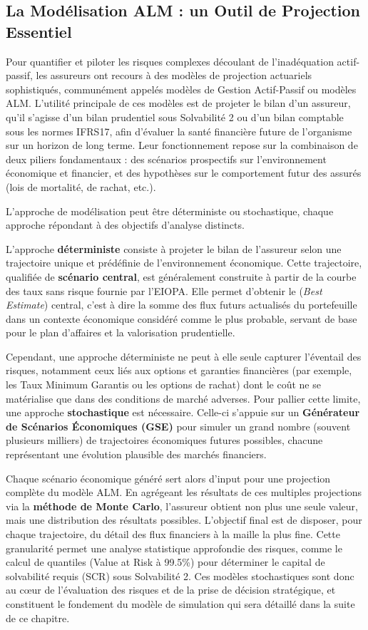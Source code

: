 \subsection{La Modélisation ALM : un Outil de Projection Essentiel}

Pour quantifier et piloter les risques complexes découlant de l'inadéquation actif-passif, les assureurs ont recours à des modèles de projection actuariels sophistiqués, communément appelés modèles de Gestion Actif-Passif ou modèles ALM. L'utilité principale de ces modèles est de projeter le bilan d'un assureur, qu'il s'agisse d'un bilan prudentiel sous Solvabilité 2 ou d'un bilan comptable sous les normes IFRS17, afin d'évaluer la santé financière future de l'organisme sur un horizon de long terme. Leur fonctionnement repose sur la combinaison de deux piliers fondamentaux : des scénarios prospectifs sur l'environnement économique et financier, et des hypothèses sur le comportement futur des assurés (lois de mortalité, de rachat, etc.).

L'approche de modélisation peut être déterministe ou stochastique, chaque approche répondant à des objectifs d'analyse distincts.

L'approche \textbf{déterministe} consiste à projeter le bilan de l'assureur selon une trajectoire unique et prédéfinie de l'environnement économique. Cette trajectoire, qualifiée de \textbf{scénario central}, est généralement construite à partir de la courbe des taux sans risque fournie par l'EIOPA. Elle permet d'obtenir le (\textit{Best Estimate}) central, c'est à dire la somme des flux futurs actualisés du portefeuille dans un contexte économique considéré comme le plus probable, servant de base pour le plan d'affaires et la valorisation prudentielle.

Cependant, une approche déterministe ne peut à elle seule capturer l'éventail des risques, notamment ceux liés aux options et garanties financières (par exemple, les Taux Minimum Garantis ou les options de rachat) dont le coût ne se matérialise que dans des conditions de marché adverses. Pour pallier cette limite, une approche \textbf{stochastique} est nécessaire. Celle-ci s'appuie sur un \textbf{Générateur de Scénarios Économiques (GSE)} pour simuler un grand nombre (souvent plusieurs milliers) de trajectoires économiques futures possibles, chacune représentant une évolution plausible des marchés financiers.

Chaque scénario économique généré sert alors d'input pour une projection complète du modèle ALM. En agrégeant les résultats de ces multiples projections via la \textbf{méthode de Monte Carlo}, l'assureur obtient non plus une seule valeur, mais une distribution des résultats possibles. L'objectif final est de disposer, pour chaque trajectoire, du détail des flux financiers à la maille la plus fine. Cette granularité permet une analyse statistique approfondie des risques, comme le calcul de quantiles (Value at Risk à 99.5\%) pour déterminer le capital de solvabilité requis (SCR) sous Solvabilité 2. Ces modèles stochastiques sont donc au cœur de l'évaluation des risques et de la prise de décision stratégique, et constituent le fondement du modèle de simulation qui sera détaillé dans la suite de ce chapitre.

